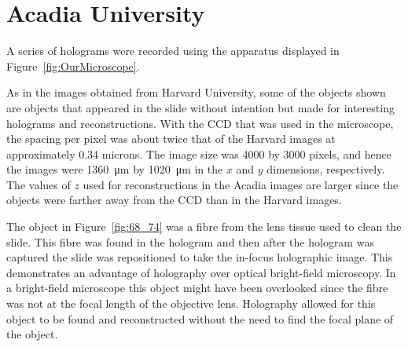 %
%

\section{Acadia University}


A series of holograms were recorded using the apparatus displayed in
Figure~\ref{fig:OurMicroscope}.

As in the images obtained from Harvard University, some of the objects shown are
objects that appeared in the slide without intention but made for interesting
holograms and reconstructions. With the CCD that was used in the microscope,
the spacing per pixel was about twice that of the Harvard images at
approximately 0.34
microns. The image size was 4000 by 3000 pixels, and hence the images were
\SI{1360}{\micro\meter} by \SI{1020}{\micro\meter} in the $x$ and $y$
dimensions, respectively. The values of $z$ used for
reconstructions in the Acadia images are larger since the objects were farther
away from the CCD than in the Harvard images.

The object in Figure~\ref{fig:68_74} was a fibre from the lens tissue used to
clean the slide. This fibre was found in the hologram and then after the
hologram was captured the slide was repositioned to take the in-focus
holographic image.
This demonstrates an advantage of holography over optical bright-field
microscopy. In a bright-field microscope this object might have been
overlooked since the fibre was not at the focal length of the objective lens. Holography allowed for
this object to be found and reconstructed without the need to find the focal
plane of the object. 



